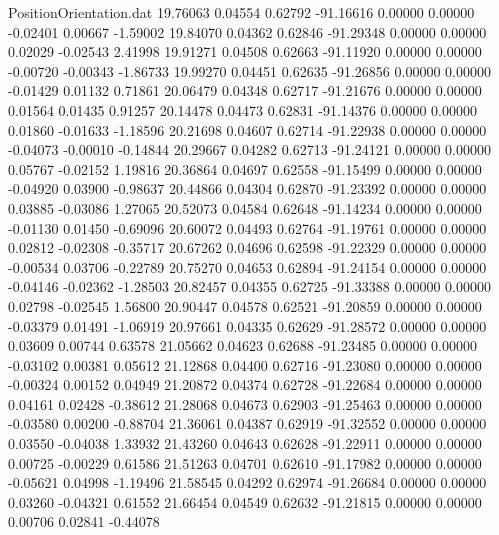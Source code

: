 \begin{filecontents}{PositionOrientation.dat}
  19.76063    0.04554    0.62792   -91.16616    0.00000    0.00000   -0.02401    0.00667   -1.59002
  19.84070    0.04362    0.62846   -91.29348    0.00000    0.00000    0.02029   -0.02543    2.41998
  19.91271    0.04508    0.62663   -91.11920    0.00000    0.00000   -0.00720   -0.00343   -1.86733
  19.99270    0.04451    0.62635   -91.26856    0.00000    0.00000   -0.01429    0.01132    0.71861
  20.06479    0.04348    0.62717   -91.21676    0.00000    0.00000    0.01564    0.01435    0.91257
  20.14478    0.04473    0.62831   -91.14376    0.00000    0.00000    0.01860   -0.01633   -1.18596
  20.21698    0.04607    0.62714   -91.22938    0.00000    0.00000   -0.04073   -0.00010   -0.14844
  20.29667    0.04282    0.62713   -91.24121    0.00000    0.00000    0.05767   -0.02152    1.19816
  20.36864    0.04697    0.62558   -91.15499    0.00000    0.00000   -0.04920    0.03900   -0.98637
  20.44866    0.04304    0.62870   -91.23392    0.00000    0.00000    0.03885   -0.03086    1.27065
  20.52073    0.04584    0.62648   -91.14234    0.00000    0.00000   -0.01130    0.01450   -0.69096
  20.60072    0.04493    0.62764   -91.19761    0.00000    0.00000    0.02812   -0.02308   -0.35717
  20.67262    0.04696    0.62598   -91.22329    0.00000    0.00000   -0.00534    0.03706   -0.22789
  20.75270    0.04653    0.62894   -91.24154    0.00000    0.00000   -0.04146   -0.02362   -1.28503
  20.82457    0.04355    0.62725   -91.33388    0.00000    0.00000    0.02798   -0.02545    1.56800
  20.90447    0.04578    0.62521   -91.20859    0.00000    0.00000   -0.03379    0.01491   -1.06919
  20.97661    0.04335    0.62629   -91.28572    0.00000    0.00000    0.03609    0.00744    0.63578
  21.05662    0.04623    0.62688   -91.23485    0.00000    0.00000   -0.03102    0.00381    0.05612
  21.12868    0.04400    0.62716   -91.23080    0.00000    0.00000   -0.00324    0.00152    0.04949
  21.20872    0.04374    0.62728   -91.22684    0.00000    0.00000    0.04161    0.02428   -0.38612
  21.28068    0.04673    0.62903   -91.25463    0.00000    0.00000   -0.03580    0.00200   -0.88704
  21.36061    0.04387    0.62919   -91.32552    0.00000    0.00000    0.03550   -0.04038    1.33932
  21.43260    0.04643    0.62628   -91.22911    0.00000    0.00000    0.00725   -0.00229    0.61586
  21.51263    0.04701    0.62610   -91.17982    0.00000    0.00000   -0.05621    0.04998   -1.19496
  21.58545    0.04292    0.62974   -91.26684    0.00000    0.00000    0.03260   -0.04321    0.61552
  21.66454    0.04549    0.62632   -91.21815    0.00000    0.00000    0.00706    0.02841   -0.44078

\end{filecontents}
